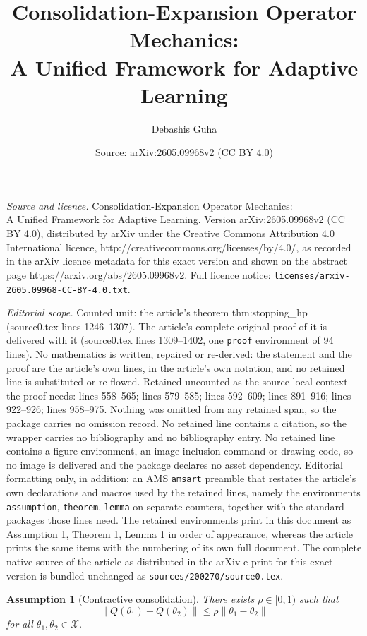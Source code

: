 \documentclass[10pt,a4paper]{amsart}
\title{Consolidation-Expansion Operator Mechanics:\\ A Unified Framework for Adaptive Learning}
\author{Debashis Guha}
\date{Source: arXiv:2605.09968v2 (CC BY 4.0)}
\newtheorem{assumption}{Assumption}
\newcommand{\X}{\mathcal{X}}
\newcommand{\norm}[1]{\left\lVert#1\right\rVert}
\begin{document}
\maketitle

\noindent\emph{Source and licence.} Consolidation-Expansion Operator Mechanics:\\ A Unified Framework for Adaptive Learning. Version arXiv:2605.09968v2 (CC BY 4.0), distributed by arXiv under the Creative Commons Attribution 4.0 International licence, http://creativecommons.org/licenses/by/4.0/, as recorded in the arXiv licence metadata for this exact version and shown on the abstract page https://arxiv.org/abs/2605.09968v2. Full licence notice: \texttt{licenses/arxiv-2605.09968-CC-BY-4.0.txt}.\par\smallskip

\noindent\textit{Editorial scope.} Counted unit: the article's theorem thm:stopping\_hp (source0.tex lines 1246--1307). The article's complete original proof of it is delivered with it (source0.tex lines 1309--1402, one \texttt{proof} environment of 94 lines). No mathematics is written, repaired or re-derived: the statement and the proof are the article's own lines, in the article's own notation, and no retained line is substituted or re-flowed.  Retained uncounted as the source-local context the proof needs: lines 558--565; lines 579--585; lines 592--609; lines 891--916; lines 922--926; lines 958--975.  Nothing was omitted from any retained span, so the package carries no omission record.  No retained line contains a citation, so the wrapper carries no bibliography and no bibliography entry.  No retained line contains a figure environment, an image-inclusion command or drawing code, so no image is delivered and the package declares no asset dependency.  Editorial formatting only, in addition: an AMS \texttt{amsart} preamble that restates the article's own declarations and macros used by the retained lines, namely the environments \texttt{assumption}, \texttt{theorem}, \texttt{lemma} on separate counters, together with the standard packages those lines need.  The retained environments print in this document as Assumption 1, Theorem 1, Lemma 1 in order of appearance, whereas the article prints the same items with the numbering of its own full document.  The complete native source of the article as distributed in the arXiv e-print for this exact version is bundled unchanged as \texttt{sources/200270/source0.tex}.
\begin{assumption}[Contractive consolidation]
\label{ass:contract}
There exists $\rho \in [0, 1)$ such that
\[
\norm{Q(\theta_1) - Q(\theta_2)} \leq \rho \norm{\theta_1 - \theta_2}
\]
for all $\theta_1, \theta_2 \in \X$.
\end{assumption}
\end{document}
